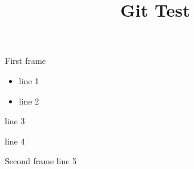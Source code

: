 \documentclass[10pt]{beamer}
\begin{document}
	
	\title{Git Test}
	\frame{\titlepage}
	

\begin{frame}{First frame}

\begin{minipage}{.5\textwidth}
	\begin{itemize}
		\item line 1
		\item line 2
	\end{itemize}
\end{minipage}
\begin{minipage}{.4\textwidth}
	line 3
	\begin{block}{}
		line 4
	\end{block}
\end{minipage}

\end{frame}

\begin{frame}{Second frame}
	line 5
\end{frame}
\end{document}
